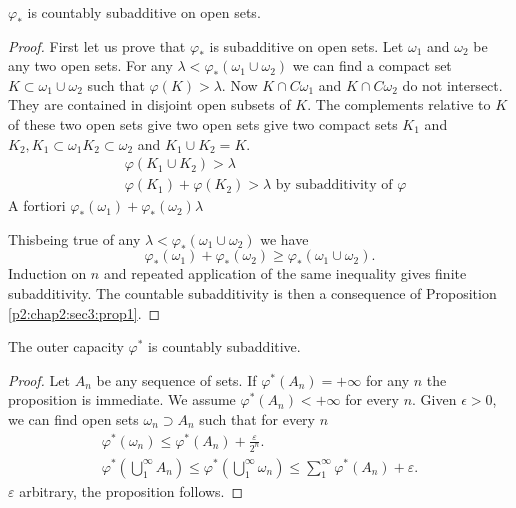 \begin{prop}\label{p2:chap2:sec3:prop2} %
  $\varphi_*$ is countably subadditive on open sets.
\end{prop}

\begin{proof} %
  First let us prove that $\varphi_*$ is subadditive on open sets. Let
  $\omega_1$ and $\omega_2$ be any two open sets. For any $\lambda <
  \varphi_* (\omega_1 \cup \omega_2)$ we can find a compact set $K
  \subset \omega_1 \cup \omega_2$ such that $\varphi (K)
  >\lambda$. Now $K \cap C \omega_1$ and $K \cap C \omega_2$ do not
  intersect. They are contained in disjoint open subsets of $K$. The
  complements relative to $K$ of these two open sets give two open
  sets give two compact sets $K_1$ and $K_2, K_1 \subset \omega_1 K_2
  \subset \omega_2$ and $K_1 \cup K_2 =K$. 
  \begin{align*}
    & \varphi(K_1 \cup K_2) > \lambda\\
    & \varphi(K_1) + \varphi(K_2) > \lambda \text{ by subadditivity of
    } \varphi
  \end{align*}
  A fortiori \qquad $ \varphi_* (\omega_1) + \varphi_* (\omega_2) \lambda$

  This\pageoriginale being true of any $\lambda < \varphi_* (\omega_1 \cup \omega_2)$
  we have 
  $$
  \varphi_* (\omega_1) + \varphi_* (\omega_2) \geq \varphi_* (\omega_1
  \cup \omega_2).  
  $$
  Induction on $n$ and repeated application of the same inequality gives
  finite subadditivity. The countable subadditivity is then a
  consequence  of Proposition \ref{p2:chap2:sec3:prop1}. 
\end{proof}

\begin{prop}\label{p2:chap2:sec3:prop3} %
  The outer capacity $\varphi^*$ is countably subadditive.
\end{prop}

\begin{proof} %
  Let $A_n$ be any sequence of sets. If $\varphi^*(A_n) = + \infty$
  for any $n$ the proposition is immediate. We assume $\varphi^*(A_n)
  < + \infty$ for every $n$. Given $\epsilon > 0$, we can find open
  sets $\omega_n \supset A_n$ such that for every $n$ 
  \begin{gather*}
    \varphi^*(\omega_n)  \leq \varphi^*(A_n) + \frac{\varepsilon}{2^n}.\\
    \varphi^*\left(\bigcup^{\infty}_1 A_n\right)  \leq
    \varphi^*\left(\bigcup^{\infty}_1 \omega_n\right)  \leq \sum^{\infty}_1
    \varphi^*(A_n) + \varepsilon. 
  \end{gather*}
  $\varepsilon$ arbitrary, the proposition follows.
\end{proof}

